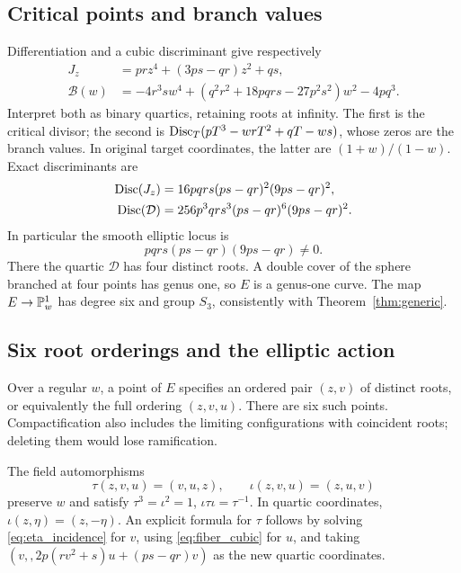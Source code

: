 \subsection{Critical points and branch values}
Differentiation and a cubic discriminant give respectively
\begin{align}\label{eq:J}
 J_z&=prz^4+(3ps-qr)z^2+qs,\\
 \mathcal B(w)&=-4r^3sw^4+(q^2r^2+18pqrs-27p^2s^2)w^2-4pq^3.
 \label{eq:branch_quartic}
\end{align}
Interpret both as binary quartics, retaining roots at infinity. The first is the critical divisor; the second is \(\operatorname{Disc}_T(pT^3-wrT^2+qT-ws)\), whose zeros are the branch values. In original target coordinates, the latter are \((1+w)/(1-w)\). Exact discriminants are
\begin{align}\label{eq:cubic_discriminants}
 \operatorname{Disc}(J_z)&=16pqrs(ps-qr)^2(9ps-qr)^2,\notag\\
 \operatorname{Disc}(\mathcal D)&=256p^3qrs^3(ps-qr)^6(9ps-qr)^2.
\end{align}
In particular the smooth elliptic locus is
\begin{equation}\label{eq:elliptic_locus}
 pqrs(ps-qr)(9ps-qr)\ne0.
\end{equation}
There the quartic \(\mathcal D\) has four distinct roots. A double cover of the sphere branched at four points has genus one, so \(E\) is a genus-one curve. The map \(E\to\mathbb P^1_w\) has degree six and group \(S_3\), consistently with Theorem~\ref{thm:generic}.

\subsection{Six root orderings and the elliptic action}\label{sec:action}
Over a regular \(w\), a point of \(E\) specifies an ordered pair \((z,v)\) of distinct roots, or equivalently the full ordering \((z,v,u)\). There are six such points. Compactification also includes the limiting configurations with coincident roots; deleting them would lose ramification.

The field automorphisms
\begin{equation}\label{eq:generators}
 \tau(z,v,u)=(v,u,z),\qquad \iota(z,v,u)=(z,u,v)
\end{equation}
preserve \(w\) and satisfy
\(\tau^3=\iota^2=1\), \(\iota\tau\iota=\tau^{-1}\).
In quartic coordinates, \(\iota(z,\eta)=(z,-\eta)\). An explicit formula for \(\tau\) follows by solving \eqref{eq:eta_incidence} for \(v\), using \eqref{eq:fiber_cubic} for \(u\), and taking
\((v,,2p(rv^2+s)u+(ps-qr)v)\) as the new quartic coordinates.

